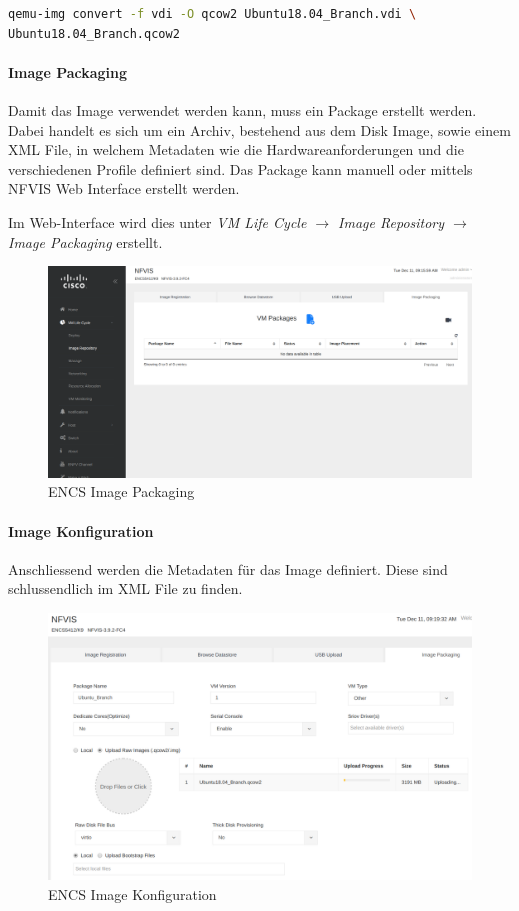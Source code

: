 \begin{lstlisting}[language=bash]
qemu-img convert -f vdi -O qcow2 Ubuntu18.04_Branch.vdi \
Ubuntu18.04_Branch.qcow2
\end{lstlisting}

\paragraph{Image Packaging}

Damit das Image verwendet werden kann, muss ein Package erstellt werden. Dabei handelt es sich um ein Archiv, bestehend aus dem Disk Image, sowie einem XML File, in welchem Metadaten wie die Hardwareanforderungen und die verschiedenen Profile definiert sind.
Das Package kann manuell oder mittels NFVIS Web Interface erstellt werden.

Im Web-Interface wird dies unter \textit{VM Life Cycle $\rightarrow$ Image Repository $\rightarrow$ Image Packaging} erstellt.

\begin{figure}[H]
	\centering
	\includegraphics[width=0.8\linewidth]{img/Absicherung/ENCS-Image-Packaging.png}
	\caption{ENCS Image Packaging}
	\label{fig:ENCS Image Packaging}
\end{figure}

\paragraph{Image Konfiguration}

Anschliessend werden die Metadaten für das Image definiert. Diese sind schlussendlich im XML File zu finden.

\begin{figure}[H]
	\centering
	\includegraphics[width=0.8\linewidth]{img/Absicherung/ENCS-Image-Creation.png}
	\caption{ENCS Image Konfiguration}
	\label{fig:ENCS Image Konfiguration}
\end{figure}

